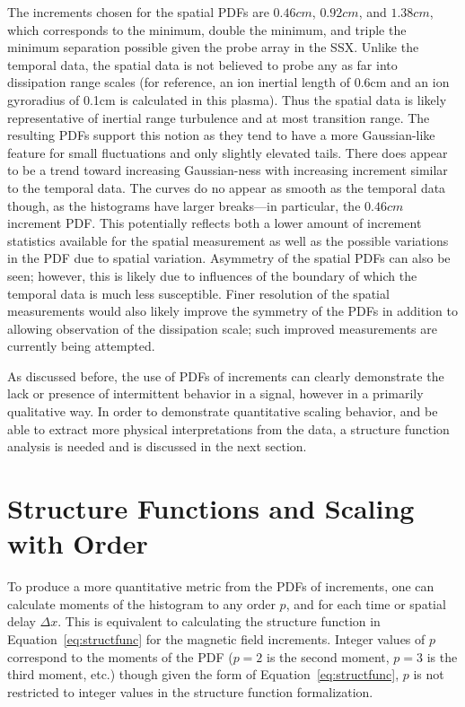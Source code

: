 \documentclass[aps,prl,amsmath,amssymb,reprint,superscriptaddress]{revtex4-1} %
\begin{document}
The increments chosen for the spatial PDFs are $0.46cm$, $0.92cm$, and $1.38cm$, which corresponds to the minimum, double the minimum, and triple the minimum separation possible given the probe array in the SSX. Unlike the temporal data, the spatial data is not believed to probe any as far into dissipation range scales (for reference, an ion inertial length of 0.6cm  and an ion gyroradius of 0.1cm is calculated in this plasma). Thus the spatial data is likely representative of inertial range turbulence and at most transition range. The resulting PDFs support this notion as they tend to have a more Gaussian-like feature for small fluctuations and only slightly elevated tails. There does appear to be a trend toward increasing Gaussian-ness with increasing increment similar to the temporal data. The curves do no appear as smooth as the temporal data though, as the histograms have larger breaks---in particular, the $0.46cm$ increment PDF. This potentially reflects both a lower amount of increment statistics available for the spatial measurement as well as the possible variations in the PDF due to spatial variation. Asymmetry of the spatial PDFs can also be seen; however, this is likely due to influences of the boundary of which the temporal data is much less susceptible. Finer resolution of the spatial measurements would also likely improve the symmetry of the PDFs in addition to allowing observation of the dissipation scale; such improved measurements are currently being attempted.

As discussed before, the use of PDFs of increments can clearly demonstrate the lack or presence of intermittent behavior in a signal, however in a primarily qualitative way. In order to demonstrate quantitative scaling behavior, and be able to extract more physical interpretations from the data, a structure function analysis is needed and is discussed in the next section.

\section{Structure Functions and Scaling with Order}\label{sec:structs}

To produce a more quantitative metric from the PDFs of increments, one can calculate moments of the histogram to any order $p$, and for each time or spatial delay $\Delta x$. This is equivalent to calculating the structure function in Equation~\ref{eq:structfunc} for the magnetic field increments. Integer values of $p$ correspond to the moments of the PDF ($p=2$ is the second moment, $p=3$ is the third moment, etc.) though given the form of Equation~\ref{eq:structfunc}, $p$ is not restricted to integer values in the structure function formalization.
\end{document}
